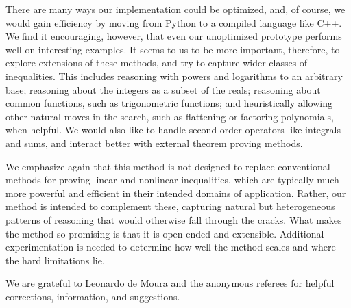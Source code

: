 \documentclass[runningheds]{llncs}
\begin{document}
There are many ways our implementation could be optimized, and, of course, we would gain efficiency by moving from Python to a compiled language like C++. We find it encouraging, however, that even our unoptimized prototype performs well on interesting examples. It seems to us to be more important, therefore, to explore extensions of these methods, and try to capture wider classes of inequalities. This includes reasoning with powers and logarithms to an arbitrary base; reasoning about the integers as a subset of the reals; reasoning about common functions, such as trigonometric functions; and heuristically allowing other natural moves in the search, such as flattening or factoring polynomials, when helpful. We would also like to handle second-order operators like integrals and sums, and interact better with external theorem proving methods.

We emphasize again that this method is not designed to replace conventional methods for proving linear and nonlinear inequalities, which are typically much more powerful and efficient in their intended domains of application. Rather, our method is intended to complement these, capturing natural but heterogeneous patterns of reasoning that would otherwise fall through the cracks. What makes the method so promising is that it is open-ended and extensible. Additional experimentation is needed to determine how well the method scales and where the hard limitations lie. 

\medskip

 We are grateful to Leonardo de Moura and the anonymous referees for helpful corrections, information, and suggestions.
\end{document}
